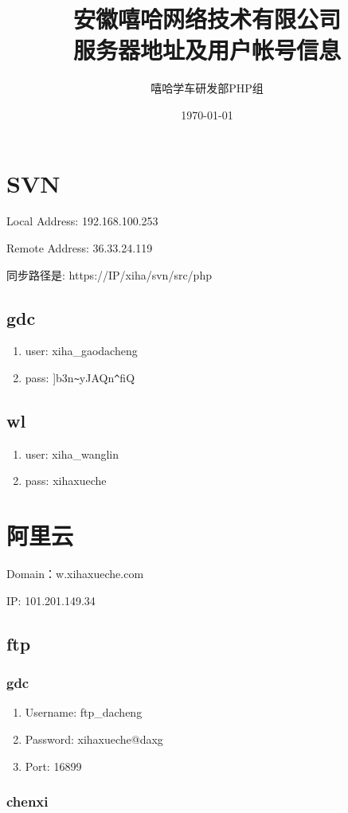 \documentclass[UTF8, a4paper, titlepage]{ctexart}
\title{安徽嘻哈网络技术有限公司\\
[2ex]\small{服务器地址及用户帐号信息}}
\date{\today}
\author{嘻哈学车研发部PHP组}
\begin{document}
\maketitle

\section{SVN}
Local Address: 192.168.100.253

Remote Address: 36.33.24.119

同步路径是: https://IP/xiha/svn/src/php
\subsection{gdc}
\begin{enumerate}
    \item user: xiha\_gaodacheng
    \item pass: ]b3n\verb|~|yJAQn\verb|^|fiQ
\end{enumerate}
\subsection{wl}
\begin{enumerate}
    \item user: xiha\_wanglin
    \item pass: xihaxueche
\end{enumerate}


\newpage
\section{阿里云}
Domain：w.xihaxueche.com

IP: 101.201.149.34

\subsection{ftp}
\subsubsection{gdc}
\begin{enumerate}
    \item Username: ftp\_dacheng
    \item Password: xihaxueche@daxg
    \item Port: 16899
\end{enumerate}
\subsubsection{chenxi}
\end{document}
